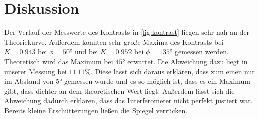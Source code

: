 \section{Diskussion}
\label{sec:Diskussion}

Der Verlauf der Messwerte des Kontrasts in \autoref{fig:kontrast} liegen sehr nah an der Theoriekurve. Außerdem konnten sehr große Maxima 
des Kontrasts bei $K=0.943$ bei $\phi=50°$ und bei $K=0.952$ bei $\phi = 135°$ gemessen werden. Theoretisch wird das Maximum bei $45°$ 
erwartet. Die Abweichung dazu liegt in unserer Messung bei $11.11\%$. Diese lässt sich daraus erklären, dass zum einen nur im Abstand von 
$5°$ gemessen wurde und es so möglich ist, dass es ein Maximum gibt, dass dichter an dem theoretischen Wert liegt. Außerdem lässt sich die 
Abweichung dadurch erklären, dass das Interferometer nicht perfekt justiert war. Bereits kleine Erschütterungen ließen die Spiegel verrücken.